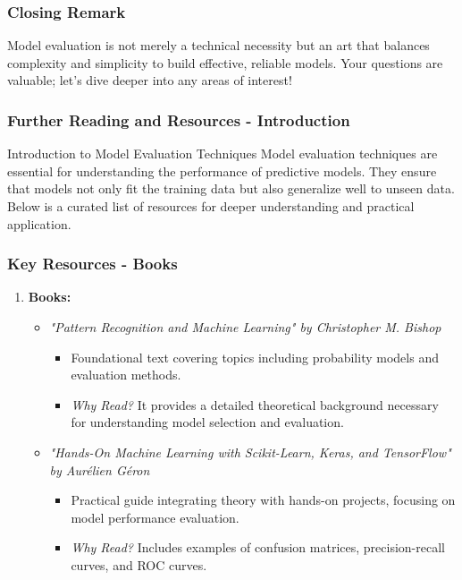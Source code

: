 \documentclass[aspectratio=169]{beamer}
\begin{document}
\begin{frame}[fragile]
    \frametitle{Closing Remark}
    Model evaluation is not merely a technical necessity but an art that balances complexity and simplicity to build effective, reliable models. Your questions are valuable; let's dive deeper into any areas of interest!
\end{frame}

\begin{frame}[fragile]
    \frametitle{Further Reading and Resources - Introduction}
    \begin{block}{Introduction to Model Evaluation Techniques}
        Model evaluation techniques are essential for understanding the performance of predictive models. They ensure that models not only fit the training data but also generalize well to unseen data. Below is a curated list of resources for deeper understanding and practical application.
    \end{block}
\end{frame}

\begin{frame}[fragile]
    \frametitle{Key Resources - Books}
    \begin{enumerate}
        \item \textbf{Books:}
        \begin{itemize}
            \item \textit{"Pattern Recognition and Machine Learning" by Christopher M. Bishop}
            \begin{itemize}
                \item Foundational text covering topics including probability models and evaluation methods.
                \item \textit{Why Read?} It provides a detailed theoretical background necessary for understanding model selection and evaluation.
            \end{itemize}
            
            \item \textit{"Hands-On Machine Learning with Scikit-Learn, Keras, and TensorFlow" by Aurélien Géron}
            \begin{itemize}
                \item Practical guide integrating theory with hands-on projects, focusing on model performance evaluation.
                \item \textit{Why Read?} Includes examples of confusion matrices, precision-recall curves, and ROC curves.
            \end{itemize}
        \end{itemize}
    \end{enumerate}
\end{frame}
\end{document}
